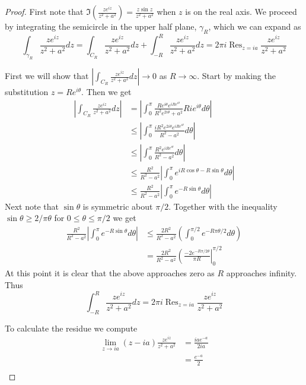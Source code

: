 \documentclass[10pt]{article}
\DeclareMathOperator{\Res}{Res}
\theoremstyle{remark}
\theoremstyle{remark}
\begin{document}
\begin{proof}
  First note that $\Im\left(\frac{ze^{iz}}{z^2+a^2}\right)=\frac{z\sin z}{z^2+a^2}$ when $z$ is on the real axis. We proceed
  by integrating the semicircle in the upper half plane, $\gamma_R$, which we can
  expand as
  \[
    \int_{\gamma_R}\frac{ze^{iz}}{z^2+a^2}dz=\int_{C_R}\frac{ze^{iz}}{z^2+a^2}dz+\int_{-R}^R\frac{ze^{iz}}{z^2+a^2} dz = 2\pi i\Res_{z=ia}\frac{ze^{iz}}{z^2+a^2}
  \]

  First we will show that $\left|\int_{C_R}\frac{ze^{iz}}{z^2+a^2}dz\right|\rightarrow 0$ as $R\rightarrow\infty$. Start by
  making the substitution $z=Re^{i\theta}$. Then we get
  \begin{align*}
    \left|\int_{C_R}\frac{ze^{iz}}{z^2+a^2}dz\right| &= \left|\int_0^\pi\frac{Re^{i\theta}e^{iRe^{i\theta}}}{R^2e^{2i\theta}+a^2}Rie^{i\theta}d\theta\right|\\
                                                  &\leq \left|\int_0^\pi\frac{iR^2e^{2i\theta}e^{iRe^{i\theta}}}{R^2-a^2}d\theta\right|\\
                                                  &\leq\left|\int_0^\pi\frac{R^2e^{iRe^{i\theta}}}{R^2-a^2}d\theta\right|\\
                                                  &\leq\frac{R^2}{R^2-a^2}\left|\int_0^\pi e^{iR\cos\theta-R\sin\theta}d\theta\right|\\
                                                  &\le\frac{R^2}{R^2-a^2}\left|\int_0^\pi e^{-R\sin\theta}d\theta\right|
  \end{align*}
  Next note that $\sin\theta$ is symmetric about $\pi/2$. Together
  with the inequality $\sin\theta\geq 2/\pi\theta$ for $0\leq\theta\leq\pi/2$ we get
  \begin{align*}
    \frac{R^2}{R^2-a^2}\left|\int_0^\pi e^{-R\sin\theta}d\theta\right| &\leq\frac{2R^2}{R^2-a^2}\left(\int_0^{\pi/2}e^{-R\pi\theta/2}d\theta\right)\\
                                                               &=\frac{2R^2}{R^2-a^2}\left(\frac{-2e^{-R\pi/2\theta}}{\pi R}\right|_0^{\pi/2}
  \end{align*}%
  At this point it is clear that the above approaches zero as $R$ approaches infinity.
  Thus
  \[
    \int_{-R}^R \frac{ze^{iz}}{z^2+a^2}dz = 2\pi i\Res_{z=ia}\frac{ze^{iz}}{z^2+a^2}
  \]

  To calculate the residue we compute
  \begin{align*}
    \lim_{z\rightarrow ia}(z-ia)\frac{ze^{iz}}{z^2+a^2}&=\frac{iae^{-a}}{2ia}\\
                                             &=\frac{e^{-a}}{2}\\
  \end{align*}


\end{proof}
\end{document}
